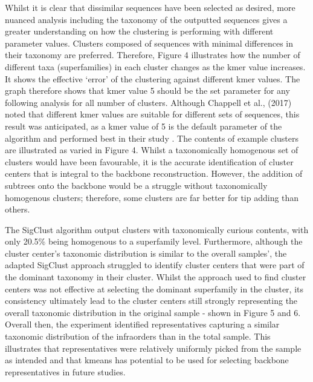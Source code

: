 \documentclass[12pt]{article}
\begin{document}
  Whilst it is clear that dissimilar sequences have been selected as desired, more nuanced analysis including the taxonomy of the outputted sequences gives a greater understanding on how the clustering is performing with different parameter values. Clusters composed of sequences with minimal differences in their taxonomy are preferred. Therefore, Figure 4 illustrates how the number of different taxa (superfamilies) in each cluster changes as the kmer value increases. It shows the effective `error' of the clustering against different kmer values. The graph therefore shows that kmer value 5 should be the set parameter for any following analysis for all number of clusters. Although Chappell et al., (2017) noted that different kmer values are suitable for different sets of sequences, this result was anticipated, as a kmer value of 5 is the default parameter of the algorithm and performed best in their study \cite{Chappell2017}. The contents of example clusters are illustrated as varied in Figure 4. Whilst a taxonomically homogenous set of clusters would have been favourable, it is the accurate identification of cluster centers that is integral to the backbone reconstruction. However, the addition of subtrees onto the backbone would be a struggle without taxonomically homogenous clusters; therefore, some clusters are far better for tip adding than others. 

  The SigClust algorithm output clusters with taxonomically curious contents, with only 20.5\% being homogenous to a superfamily level. Furthermore, although the cluster center's taxonomic distribution is similar to the overall samples', the adapted SigClust approach struggled to identify cluster centers that were part of the dominant taxonomy in their cluster. Whilst the approach used to find cluster centers was not effective at selecting the dominant superfamily in the cluster, its consistency ultimately lead to the cluster centers still strongly representing the overall taxonomic distribution in the original sample - shown in Figure 5 and 6. Overall then, the experiment identified representatives capturing a similar taxonomic distribution of the infraorders than in the total sample. This illustrates that representatives were relatively uniformly picked from the sample as intended and that kmeans has potential to be used for selecting backbone representatives in future studies.
\end{document}
